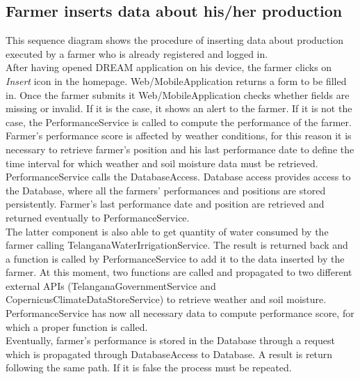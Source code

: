 \subsection{Farmer inserts data about his/her production}

This sequence diagram shows the procedure of inserting data about production executed by a farmer who is already registered and logged in.\\
After having opened DREAM application on his device, the farmer clicks on \textit{Insert} icon in the homepage. Web/MobileApplication returns a form to be filled in. Once the farmer submits it Web/MobileApplication checks whether fields are missing or invalid. If it is the case, it shows an alert to the farmer. If it is not the case, the PerformanceService is called to compute the performance of the farmer.\\
Farmer's performance score is affected by weather conditions, for this reason it is necessary to retrieve farmer's position and his last performance date to define the time interval for which weather and soil moisture data must be retrieved. PerformanceService calls the DatabaseAccess. Database access provides access to the Database, where all the farmers' performances and positions are stored persistently. Farmer's last performance date and position are retrieved and returned eventually to PerformanceService.\\
The latter component is also able to get quantity of water consumed by the farmer calling TelanganaWaterIrrigationService. The result is returned back and a function is called by PerformanceService to add it to  the data inserted by the farmer. At this moment, two functions are called and propagated to two different external APIs (TelanganaGovernmentService and CopernicusClimateDataStoreService) to retrieve weather and soil moisture.\\ 
PerformanceService has now all necessary data to compute performance score, for which a proper function is called.\\
Eventually, farmer's performance is stored in the Database through a request which is propagated through DatabaseAccess to Database. A result is return following the same path. If it is false the process must be repeated. 


